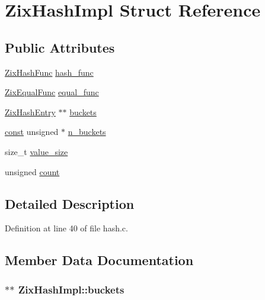 \hypertarget{struct_zix_hash_impl}{}\section{Zix\+Hash\+Impl Struct Reference}
\label{struct_zix_hash_impl}
\subsection*{Public Attributes}
\begin{DoxyCompactItemize}
\item 
\hyperlink{group__zix_ga42772c8370d1039115cca0504a225aee}{Zix\+Hash\+Func} \hyperlink{struct_zix_hash_impl_af77da5cd016af1529c9913a6ddd7cac3}{hash\+\_\+func}
\item 
\hyperlink{group__zix_ga4cb30cbc7c5989a17b2b73ee23f63686}{Zix\+Equal\+Func} \hyperlink{struct_zix_hash_impl_a3de67228ddf37247725de59c8c2483cc}{equal\+\_\+func}
\item 
\hyperlink{struct_zix_hash_entry}{Zix\+Hash\+Entry} $\ast$$\ast$ \hyperlink{struct_zix_hash_impl_a8ec51f8e6955cc6428576bcbe829043f}{buckets}
\item 
\hyperlink{getopt1_8c_a2c212835823e3c54a8ab6d95c652660e}{const} unsigned $\ast$ \hyperlink{struct_zix_hash_impl_a7ef166f3dcdef84f2decdc956142441b}{n\+\_\+buckets}
\item 
size\+\_\+t \hyperlink{struct_zix_hash_impl_a1ab78e78d47365220f8b1d82aff7f3fe}{value\+\_\+size}
\item 
unsigned \hyperlink{struct_zix_hash_impl_a39b61f4305e5aa4d5fffc508a0790c2c}{count}
\end{DoxyCompactItemize}


\subsection{Detailed Description}


Definition at line 40 of file hash.\+c.



\subsection{Member Data Documentation}
\subsubsection[{\texorpdfstring{buckets}{buckets}}]{$\ast$$\ast$ Zix\+Hash\+Impl\+::buckets}\hypertarget{struct_zix_hash_impl_a8ec51f8e6955cc6428576bcbe829043f}{}\label{struct_zix_hash_impl_a8ec51f8e6955cc6428576bcbe829043f}


